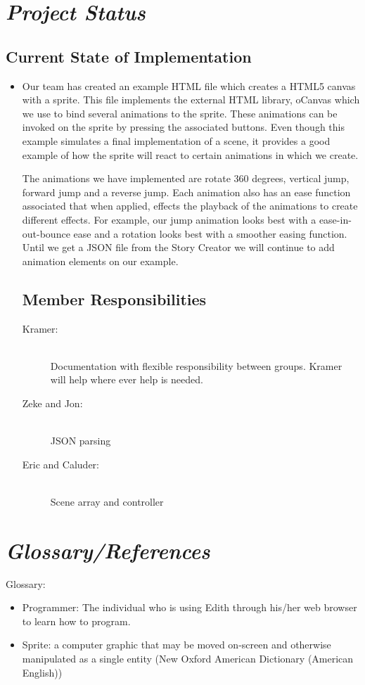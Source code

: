 \documentclass[12pt]{article}
\begin{document}
\section{\emph{Project Status}}
\noindent\subsection{Current State of Implementation}
\begin{itemize}
	\item Our team has created an example HTML file which creates a HTML5 canvas with a sprite. This file implements the external HTML library, oCanvas which we use to bind several animations to the sprite. These animations can be invoked on the sprite by pressing the associated buttons. Even though this example simulates a final implementation of a scene, it provides a good example of how the sprite will react to certain animations in which we create. 

The animations we have implemented are rotate 360 degrees, vertical jump, forward jump and a reverse jump. Each animation also has an ease function associated that when applied, effects the playback of the animations to create different effects. For example, our jump animation looks best with a ease-in-out-bounce ease and a rotation looks best with a smoother easing function. Until we get a JSON file from the Story Creator we will continue to add animation elements on our example. 
	
\noindent\subsection{Member Responsibilities}


\begin{description}
  \item[Kramer:] \hfill \\
  Documentation with flexible responsibility between groups. Kramer will help where ever help is needed. 
  \item[Zeke and Jon:] \hfill \\
  JSON parsing
  \item[Eric and Caluder:] \hfill \\
  Scene array and controller
\end{description}

\end{itemize}

\section{\emph{Glossary/References}}
Glossary:
\begin{itemize}
	\item Programmer: The individual who is using Edith through his/her web browser to learn how to program.
	\item Sprite: a computer graphic that may be moved on-screen and otherwise manipulated as a single entity (New Oxford American Dictionary (American English))
\end{itemize}
	

	
\end{document}
